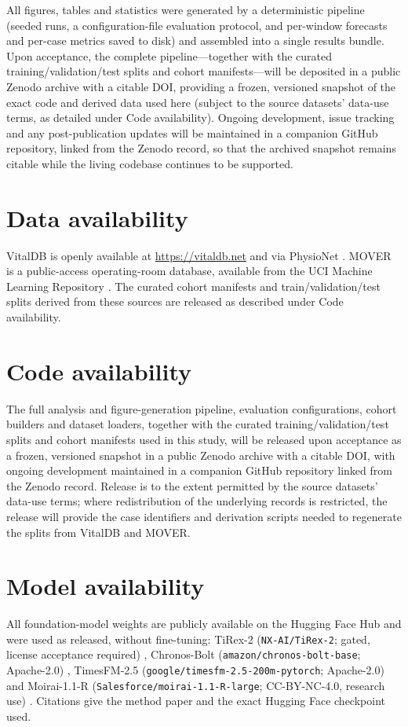 \documentclass[11pt]{article}
\begin{document}
All figures, tables and statistics were generated by a deterministic pipeline
(seeded runs, a configuration-file evaluation protocol, and per-window
forecasts and per-case metrics saved to disk) and assembled into a single
results bundle. Upon acceptance, the complete pipeline---together with the
curated training/validation/test splits and cohort manifests---will be
deposited in a public Zenodo archive with a citable DOI, providing a frozen,
versioned snapshot of the exact code and derived data used here (subject to
the source datasets' data-use terms, as detailed under Code availability).
Ongoing development, issue tracking and any post-publication updates will be
maintained in a companion GitHub repository, linked from the Zenodo record,
so that the archived snapshot remains citable while the living codebase
continues to be supported.

\section*{Data availability}
VitalDB is openly available at \url{https://vitaldb.net} and via PhysioNet
\citep{VitalDBPhysioNet2022}. MOVER is a public-access operating-room
database, available from the UCI Machine Learning Repository
\citep{Samad2023,MOVERUCI2023}. The curated cohort manifests and
train/validation/test splits derived from these sources are released as
described under Code availability.

\section*{Code availability}
The full analysis and figure-generation pipeline, evaluation configurations,
cohort builders and dataset loaders, together with the curated
training/validation/test splits and cohort manifests used in this study,
will be released upon acceptance as a frozen, versioned snapshot in a public
Zenodo archive with a citable DOI, with ongoing development maintained in a
companion GitHub repository linked from the Zenodo record. Release is to the
extent permitted by the source datasets' data-use terms; where redistribution
of the underlying records is restricted, the release will provide the case
identifiers and derivation scripts needed to regenerate
the splits from VitalDB and MOVER.

\section*{Model availability}
All foundation-model weights are publicly available on the Hugging Face Hub
and were used as released, without fine-tuning: TiRex-2 (\texttt{NX-AI/\allowbreak TiRex-2};
gated, license acceptance required) \citep{Podest2026,Auer2025,HFTiRex2},
Chronos-Bolt (\texttt{amazon/\allowbreak chronos-bolt-base}; Apache-2.0)
\citep{Ansari2024,HFChronosBolt}, TimesFM-2.5
(\texttt{google/\allowbreak timesfm-2.5-\allowbreak 200m-pytorch}; Apache-2.0)
\citep{Das2024,HFTimesFM} and Moirai-1.1-R
(\texttt{Salesforce/\allowbreak moirai-1.1-R-large}; CC-BY-NC-4.0, research use)
\citep{Woo2024,HFMoirai}. Citations give the method paper and the exact
Hugging Face checkpoint used.
\end{document}
